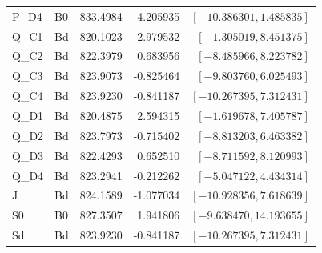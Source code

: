 \begin{longtable}{llrrr}
P\_D4 & B0 & 833.4984 & -4.205935 & $[-10.386301, 1.485835]$\\
Q\_C1 & Bd & 820.1023 & 2.979532 & $[-1.305019, 8.451375]$\\
Q\_C2 & Bd & 822.3979 & 0.683956 & $[-8.485966, 8.223782]$\\
Q\_C3 & Bd & 823.9073 & -0.825464 & $[-9.803760, 6.025493]$\\
Q\_C4 & Bd & 823.9230 & -0.841187 & $[-10.267395, 7.312431]$\\
Q\_D1 & Bd & 820.4875 & 2.594315 & $[-1.619678, 7.405787]$\\
Q\_D2 & Bd & 823.7973 & -0.715402 & $[-8.813203, 6.463382]$\\
Q\_D3 & Bd & 822.4293 & 0.652510 & $[-8.711592, 8.120993]$\\
Q\_D4 & Bd & 823.2941 & -0.212262 & $[-5.047122, 4.434314]$\\
J & Bd & 824.1589 & -1.077034 & $[-10.928356, 7.618639]$\\
S0 & B0 & 827.3507 & 1.941806 & $[-9.638470, 14.193655]$\\
Sd & Bd & 823.9230 & -0.841187 & $[-10.267395, 7.312431]$\\
\bottomrule\end{longtable}\normalsize
